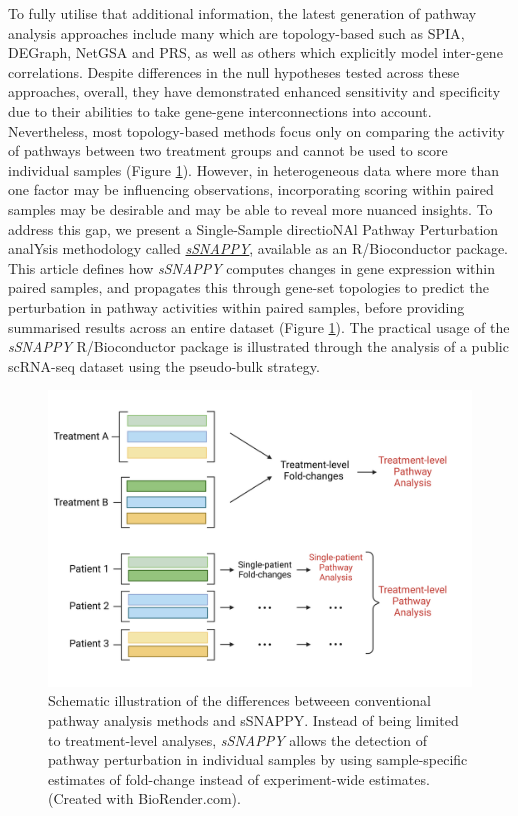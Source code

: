 \documentclass[9pt,a4paper,]{extarticle}
\begin{document}
To fully utilise that additional information, the latest generation of pathway analysis approaches include many which are topology-based such as SPIA\citep{Tarca2009}, DEGraph\citep{Jacob2012}, NetGSA\citep{Ma2016} and PRS\citep{Ibrahim2012}, as well as others which explicitly model inter-gene correlations\citep{Wu2012}.
Despite differences in the null hypotheses tested across these approaches, overall, they have demonstrated enhanced sensitivity and specificity due to their abilities to take gene-gene interconnections into account\citep{Nguyen2019-va, Ma2019}.
Nevertheless, most topology-based methods focus only on comparing the activity of pathways between two treatment groups and cannot be used to score individual samples (Figure \ref{fig:Figure1}).
However, in heterogeneous data where more than one factor may be influencing observations\citep{Hanzelmann2013}, incorporating scoring within paired samples may be desirable and may be able to reveal more nuanced insights.
To address this gap, we present a Single-Sample directioNAl Pathway Perturbation analYsis methodology called \href{https://bioconductor.org/packages/sSNAPPY}{\emph{sSNAPPY}}, available as an R/Bioconductor package.
This article defines how \emph{sSNAPPY} computes changes in gene expression within paired samples, and propagates this through gene-set topologies to predict the perturbation in pathway activities within paired samples, before providing summarised results across an entire dataset (Figure \ref{fig:Figure1}).
The practical usage of the \emph{sSNAPPY} R/Bioconductor package is illustrated through the analysis of a public scRNA-seq dataset using the pseudo-bulk strategy.

\begin{figure}

{\centering \includegraphics[width=1\linewidth]{sSNAPPY_paper_files/figure-latex/Figure1} 

}

\caption{Schematic illustration of the differences betweeen conventional pathway analysis methods and sSNAPPY. Instead of being limited to treatment-level analyses, \textit{sSNAPPY} allows the detection of pathway perturbation in individual samples by using sample-specific estimates of fold-change instead of experiment-wide estimates. (Created with BioRender.com).}\label{fig:Figure1}
\end{figure}
\end{document}
